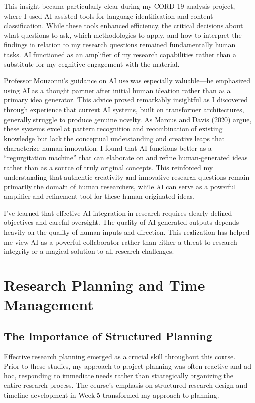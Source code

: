 \documentclass[
]{article}
\begin{document}
This insight became particularly clear during my CORD-19 analysis
project, where I used AI-assisted tools for language identification and
content classification. While these tools enhanced efficiency, the
critical decisions about what questions to ask, which methodologies to
apply, and how to interpret the findings in relation to my research
questions remained fundamentally human tasks. AI functioned as an
amplifier of my research capabilities rather than a substitute for my
cognitive engagement with the material.

Professor Mouzonni's guidance on AI use was especially valuable---he
emphasized using AI as a thought partner after initial human ideation
rather than as a primary idea generator. This advice proved remarkably
insightful as I discovered through experience that current AI systems,
built on transformer architectures, generally struggle to produce
genuine novelty. As Marcus and Davis (2020) argue, these systems excel
at pattern recognition and recombination of existing knowledge but lack
the conceptual understanding and creative leaps that characterize human
innovation. I found that AI functions better as a ``regurgitation
machine'' that can elaborate on and refine human-generated ideas rather
than as a source of truly original concepts. This reinforced my
understanding that authentic creativity and innovative research
questions remain primarily the domain of human researchers, while AI can
serve as a powerful amplifier and refinement tool for these
human-originated ideas.

I've learned that effective AI integration in research requires clearly
defined objectives and careful oversight. The quality of AI-generated
outputs depends heavily on the quality of human inputs and direction.
This realization has helped me view AI as a powerful collaborator rather
than either a threat to research integrity or a magical solution to all
research challenges.

\section{Research Planning and Time
Management}\label{research-planning-and-time-management}

\subsection{The Importance of Structured
Planning}\label{the-importance-of-structured-planning}

Effective research planning emerged as a crucial skill throughout this
course. Prior to these studies, my approach to project planning was
often reactive and ad hoc, responding to immediate needs rather than
strategically organizing the entire research process. The course's
emphasis on structured research design and timeline development in Week
5 transformed my approach to planning.
\end{document}
